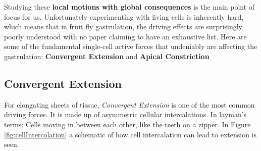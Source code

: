 Studying these \textbf{local motions with global consequences} is the main point of focus for us. Unfortunately experimenting with living cells is inherently hard, which means that in fruit fly gastrulation, the driving effects are surprisingly poorly understood with no paper claiming to have an exhaustive list. Here are some of the fundamental single-cell active forces that undeniably are affecting the gastrulation: \textbf{Convergent Extension} and \textbf{Apical Constriction}

\subsection{Convergent Extension}
\label{sec:ConvergentExtension}
For elongating sheets of tissue, \textit{Convergent Extension} is one of the most common driving forces. It is made up of asymmetric cellular intercalations. In layman's terms: Cells moving in between each other, like the teeth on a zipper. 
In Figure  \ref{fig:cellIntercolation} a schematic of how cell intercalation can lead to extension is seen.
